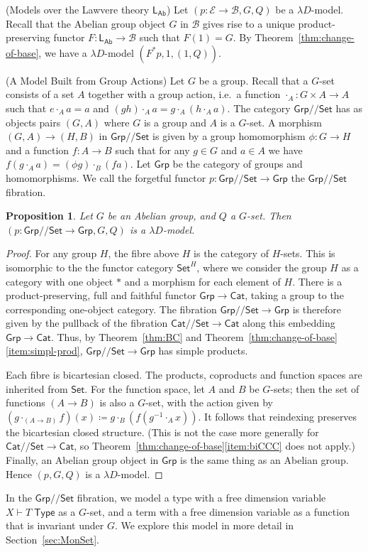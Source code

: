 \documentclass[a4paper,UKenglish]{lipics}
\newtheorem{proposition}[theorem]{Proposition}
\newcommand{\msf}[1]{\mathsf{#1}} %
\newcommand{\Grp}{\msf{Grp}}
\newcommand{\Set}{\msf{Set}}
\newcommand{\Cat}{\msf{Cat}}
\newcommand{\LAb}{\msf{L}_{\msf{Ab}}}
\newcommand{\B}{\mathcal{B}}
\newcommand{\E}{\mathcal{E}}
\newcommand{\Lslice}[1]{#1/\!/\Set}
\newcommand{\GrpSet}{\Lslice{\Grp}}
\newcommand{\CatSet}{\Lslice{\Cat}}
\newcommand{\Tj}[2]{#1 \vdash #2 \; \msf{ Type}}
\newcommand{\Dvar}{X}
\begin{document}
\begin{example}(Models over the Lawvere theory $\LAb$)
\label{ex:Lawvere}
Let $(p:\E\to\B,G,Q)$ be a $\lambda D$-model.  Recall that the Abelian group object $G$ in $\B$ gives rise to a unique product-preserving functor $F:\LAb\to \B$ such that $F(1)=G$. By Theorem~\ref{thm:change-of-base}, we have a $\lambda D$-model $(F^\ast p,1,(1, Q))$.
\end{example}

\begin{example}(A Model Built from Group Actions)
\label{ex:GrpAct}
Let $G$ be a group. Recall that a $G$-set consists of a set $A$ together with a group action, i.e.\ a function $\cdot_A:G\times A\to A$ such that $e\cdot_{A} a=a$ and $(gh)\cdot_A a=g\cdot_A (h\cdot_A a)$. The category $\GrpSet$ has as objects pairs $(G,A)$ where $G$ is a group and $A$ is a $G$-set. A morphism $(G,A) \rightarrow (H,B)$ in $\GrpSet$ is given by a group homomorphism $\phi:G\rightarrow H$ and a function $f:A \rightarrow B$ such that for any $g\in G$ and $a\in A$ we have $f (g\cdot_A a) = (\phi g)\cdot_B (f a)$. Let $\Grp$ be the category of groups and homomorphisms. We call the forgetful functor $p : \GrpSet\to \Grp$ the $\GrpSet$ fibration.

\begin{proposition}
Let $G$ be an Abelian group, and $Q$ a $G$-set. Then $(p : \GrpSet \rightarrow \Grp,G,Q)$ is a $\lambda D$-model.
\end{proposition}
\begin{proof}
For any group $H$, the fibre above $H$ is the category of $H$-sets. This is isomorphic to the the functor category ${\Set}^H$, where we consider the group $H$ as a category with one object $*$ and a morphism for each element of $H$. There is a product-preserving, full and faithful functor $\Grp\to\Cat$, taking a group to the corresponding one-object category. The fibration $\GrpSet\to\Grp$ is therefore given by the pullback of the fibration $\CatSet\to\Cat$ along this embedding $\Grp \to \Cat$. Thus, by Theorem~\ref{thm:BC} and Theorem~\ref{thm:change-of-base}\eqref{item:simpl-prod}, $\GrpSet\to\Grp$ has simple products.

Each fibre is bicartesian closed. The products, coproducts and function spaces are inherited from $\Set$. For the function space, let $A$ and $B$ be $G$-sets; then the set of functions $(A\to B)$ is also a $G$-set, with the action given by $(g\cdot_{(A\to B)}f)(x)\coloneqq g\cdot_B(f(g^{-1}\cdot_A x))$. It follows that reindexing preserves the bicartesian closed structure. (This is not the case more generally for $\CatSet\to\Cat$, so Theorem~\ref{thm:change-of-base}\eqref{item:biCCC} does not apply.)
%
Finally, an Abelian group object in $\Grp$ is the same thing as an Abelian group. Hence $(p,G,Q)$ is a $\lambda D$-model.
\end{proof}

In the $\GrpSet$ fibration, we model a type with a free dimension variable $\Tj\Dvar T$ as a $G$-set, and a term with a free dimension variable as a function that is invariant under $G$. We explore this model in more detail in Section~\ref{sec:MonSet}.
\end{example}
\end{document}
